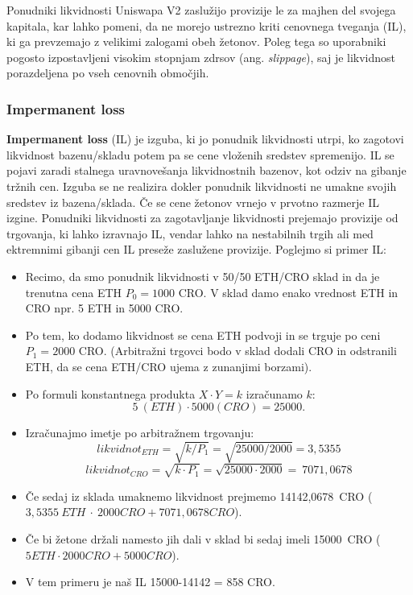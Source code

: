 \documentclass[a4paper,12pt]{article}%
\begin{document}
Ponudniki likvidnosti Uniswapa V2 zaslužijo provizije le za majhen del svojega kapitala, kar lahko pomeni, da ne morejo ustrezno kriti cenovnega tveganja (IL), ki ga prevzemajo z velikimi zalogami obeh žetonov. Poleg tega so uporabniki pogosto izpostavljeni visokim stopnjam zdrsov (ang. \textit{slippage}), saj je likvidnost porazdeljena po vseh cenovnih območjih. 




\subsubsection{Impermanent loss}
\textbf{Impermanent loss} (IL) je izguba, ki jo ponudnik likvidnosti utrpi, ko zagotovi likvidnost bazenu/skladu potem pa se cene vloženih sredstev spremenijo. IL se pojavi zaradi stalnega uravnovešanja likvidnostnih bazenov, kot odziv na gibanje tržnih cen. Izguba se ne realizira dokler ponudnik likvidnosti ne umakne svojih sredstev iz bazena/sklada. Če se cene žetonov vrnejo v prvotno razmerje IL izgine. Ponudniki likvidnosti za zagotavljanje likvidnosti prejemajo provizije od trgovanja, ki lahko izravnajo IL, vendar lahko na nestabilnih trgih ali med ektremnimi gibanji cen IL preseže zaslužene provizije. 
\newline
Poglejmo si primer IL:

\begin{itemize}
    \item Recimo, da smo ponudnik likvidnosti v 50/50 ETH/CRO sklad in da je trenutna cena ETH $P_0 = 1000$ CRO. V sklad damo enako vrednost ETH in CRO npr. 5 ETH in 5000 CRO. 
    \item Po tem, ko dodamo likvidnost se cena ETH podvoji in se trguje po ceni $P_1 = 2000$ CRO. (Arbitražni trgovci bodo v sklad dodali CRO in odstranili ETH, da se cena ETH/CRO ujema z zunanjimi borzami).
    \item Po formuli konstantnega produkta $X \cdot Y=k$ izračunamo $k$: $$5~(ETH) \cdot 5000 (CRO) = 25000.$$
    \item Izračunajmo imetje po arbitražnem trgovanju:
        $$likvidnot_{ETH} = \sqrt{k/P_1} = \sqrt{25000/2000}= 3,5355$$
        $$likvidnot_{CRO} = \sqrt{k \cdot P_1} = \sqrt{25000 \cdot 2000}=~7071,0678$$
        
    \item Če sedaj iz sklada umaknemo likvidnost prejmemo 14142,0678~CRO
    ($3,5355~ETH~\cdot~2000 CRO + 7071,0678 CRO$).
    \item Če bi žetone držali namesto jih dali v sklad bi sedaj imeli 15000~CRO ($5 ETH \cdot 2000 CRO + 5000 CRO$).
    \item V tem primeru je naš IL 15000-14142 = 858 CRO.


\end{itemize}
\end{document}
